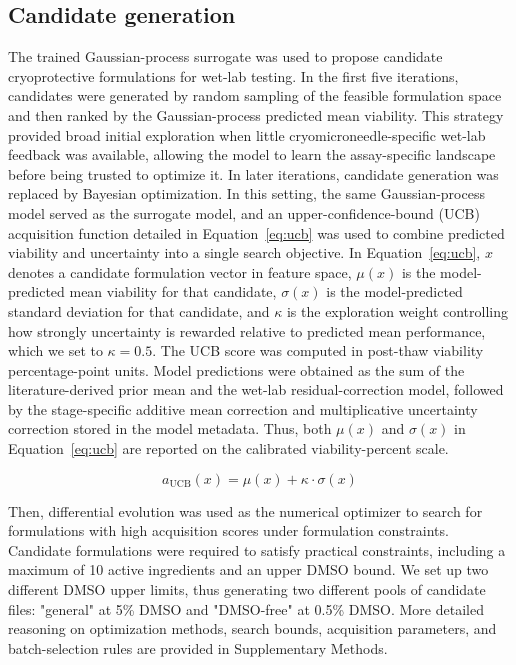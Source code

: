 \documentclass[11pt]{article}
\begin{document}
\subsection{Candidate generation}

The trained Gaussian-process surrogate was used to propose candidate cryoprotective formulations for wet-lab testing. In the first five iterations, candidates were generated by random sampling of the feasible formulation space and then ranked by the Gaussian-process predicted mean viability. This strategy provided broad initial exploration when little cryomicroneedle-specific wet-lab feedback was available, allowing the model to learn the assay-specific landscape before being trusted to optimize it. In later iterations, candidate generation was replaced by Bayesian optimization. In this setting, the same Gaussian-process model served as the surrogate model, and an upper-confidence-bound (UCB) acquisition function detailed in Equation~\ref{eq:ucb} was used to combine predicted viability and uncertainty into a single search objective. In Equation~\ref{eq:ucb}, $x$ denotes a candidate formulation vector in feature space, $\mu{}\left(x\right)$ is the model-predicted mean viability for that candidate, $\sigma{}\left(x\right)$ is the model-predicted standard deviation for that candidate, and $\kappa{}$ is the exploration weight controlling how strongly uncertainty is rewarded relative to predicted mean performance, which we set to $\kappa{}=0.5$. The UCB score was computed in post-thaw viability percentage-point units. Model predictions were obtained as the sum of the literature-derived prior mean and the wet-lab residual-correction model, followed by the stage-specific additive mean correction and multiplicative uncertainty correction stored in the model metadata. Thus, both $\mu(x)$ and $\sigma(x)$ in Equation~\ref{eq:ucb} are reported on the calibrated viability-percent scale.

\begin{equation}
a_{\mathrm{UCB}}\left(x\right)= \mu{}\left(x\right)+\kappa{}\cdot{}\sigma{}\left(x\right)\label{eq:ucb}
\end{equation}

Then, differential evolution was used as the numerical optimizer to search for formulations with high acquisition scores under formulation constraints. Candidate formulations were required to satisfy practical constraints, including a maximum of 10 active ingredients and an upper DMSO bound. We set up two different DMSO upper limits, thus generating two different pools of candidate files: "general" at 5\% DMSO and "DMSO-free" at 0.5\% DMSO\@. More detailed reasoning on optimization methods, search bounds, acquisition parameters, and batch-selection rules are provided in Supplementary Methods.
\end{document}
